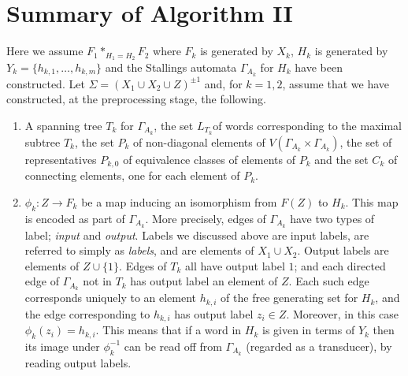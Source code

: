 \documentclass[a4paper,12pt]{article}
\newcommand{\G}{\Gamma }
\renewcommand{\S}{\Sigma }
\numberwithin{equation}{section}
\numberwithin{figure}{section}
\newcommand{\maps}{\rightarrow}
\newcommand{\be}{\begin{enumerate}}
\newcommand{\ee}{\end{enumerate}}
\begin{document}
\section{Summary of Algorithm II}
Here we assume $F_1*_{H_1=H_2} F_2$
 where $F_k$ is generated by $X_k$, $H_k$ is generated 
by $Y_k=\{h_{k,1},\ldots, h_{k,m}\}$ 
and the Stallings automata $\G_{A_k}$ for $H_k$ have
been constructed. Let  $\S=(X_1\cup X_2\cup Z)^{\pm 1}$ and, for $k=1,2$,  
assume that we have constructed, at the preprocessing stage, the following. 
\be
\item 
A spanning tree  $T_k$ for $\G_{A_k}$, 
 the set $L_{T_k}$of words corresponding to the  maximal subtree $T_k$, 
the set $P_k$ of non-diagonal elements of 
$V( \G_{A_k}\times \G_{A_k})$,   
 the set of representatives  $P_{k,0}$ of equivalence classes of 
elements of $P_k$ and the
set $C_k$ of connecting elements, one for each element of $P_k$.
\item $\phi_k:Z\maps F_k$ be a map inducing an isomorphism from $F(Z)$ to
$H_k$. This map is encoded as part of $\G_{A_k}$. More precisely, 
edges of $\G_{A_k}$ have two types of label; \emph{input} and \emph{output}.
Labels we discussed above are input labels, are 
referred to simply as \emph{labels}, and are elements of $X_1\cup X_2$. 
Output labels are elements of  $Z\cup \{1\}$.
 Edges of $T_k$  all have output label $1$; and each directed 
edge of $\G_{A_k}$ not in $T_k$ has output 
label an element of $Z$. Each such edge corresponds uniquely to
 an element $h_{k,i}$ of the free generating set for $H_k$, and the edge
corresponding to $h_{k,i}$ has 
 output label  $z_i\in Z$. Moreover, in this case $\phi_k(z_i)=h_{k,i}$.  
  This means that if a word in $H_k$ is given in terms of $Y_k$  then its
image under $\phi_k^{-1}$ can be read off from $\G_{A_k}$ (regarded as a
 transducer), by reading output labels. 
\ee
 
\end{document}

